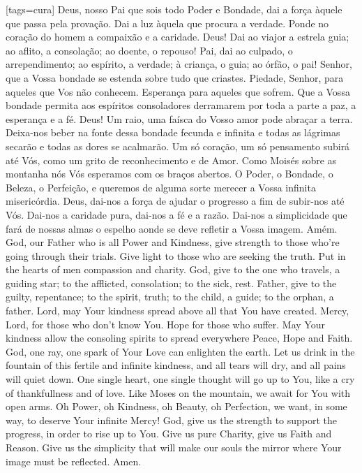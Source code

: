 \sclearpage
{}[tags={cura}]
  \beginverse
    Deus, nosso Pai que sois todo Poder e Bondade, dai
    a força àquele que passa pela provação.
    \ind Dai a luz àquela que procura a verdade.
    \ind Ponde no coração do homem a compaixão e a caridade.
    \ind Deus! Dai ao viajor a estrela guia; ao aflito,
    a consolação; ao doente, o repouso!
    \ind Pai, dai ao culpado, o arrependimento; ao espírito,
    a verdade; à criança, o guia; ao órfão, o pai!
    \ind Senhor, que a Vossa bondade se estenda sobre tudo
    que criastes.
    \ind Piedade, Senhor, para aqueles que Vos não conhecem.
    \ind Esperança para aqueles que sofrem.
    \ind Que a Vossa bondade permita aos espíritos
    consoladores derramarem por toda a parte a paz, a
    esperança e a fé.
    \ind Deus! Um raio, uma faísca do Vosso amor pode abraçar
    a terra.
    \ind Deixa-nos beber na fonte dessa bondade fecunda
    e infinita e todas as lágrimas secarão e todas as
    dores se acalmarão.
    \ind Um só coração, um só pensamento subirá até Vós,
    como um grito de reconhecimento e de Amor.
    \ind Como Moisés sobre as montanha nós Vós esperamos
    com os braços abertos.
    \ind O Poder, o Bondade, o Beleza, o Perfeição, e
    queremos de alguma sorte merecer a Vossa infinita
    misericórdia.
    \ind Deus, dai-nos a força de ajudar o progresso a fim
    de subir-nos até Vós.
    \ind Dai-nos a caridade pura, dai-nos a fé e a razão.
    \ind Dai-nos a simplicidade que fará de nossas almas o
    espelho aonde se deve refletir a Vossa imagem.
    \preceparspace
    Amém.
  \endverse
  \forcebrk
  \vspace*{-1.1em}
  \beginverse\color{englishcolor}
    God, our Father who is all Power and Kindness,
    give strength to those who're going through
    their trials.
    \ind Give light to those who are seeking the truth.
    \ind Put in the hearts of men compassion and charity.
    \ind God, give to the one who travels, a guiding star;
    to the afflicted, consolation; to the sick, rest.
    \ind Father, give to the guilty, repentance; to the
    spirit, truth; to the child, a guide; to the orphan,
    a father.
    \ind Lord, may Your kindness spread above all that You
    have created.
    \ind Mercy, Lord, for those who don't know You.
    \ind Hope for those who suffer.
    \ind May Your kindness allow the consoling spirits to
    spread everywhere Peace, Hope and Faith.
    \ind God, one ray, one spark of Your Love can enlighten
    the earth.
    \ind Let us drink in the fountain of this fertile and
    infinite kindness, and all tears will dry, and all pains
    will quiet down.
    \ind One single heart, one single thought will go up to
    You, like a cry of thankfullness and of love.
    \ind Like Moses on the mountain, we await for You with
    open arms.
    \ind Oh Power, oh Kindness, oh Beauty, oh Perfection,
    we want, in some way, to deserve Your infinite Mercy!
    \ind God, give us the strength to support the progress,
    in order to rise up to You.
    \ind Give us pure Charity, give us Faith and Reason.
    \ind Give us the simplicity that will make our souls the
    mirror where Your image must be reflected.
    \preceparspace
    Amen.
  \endverse
\endsong


